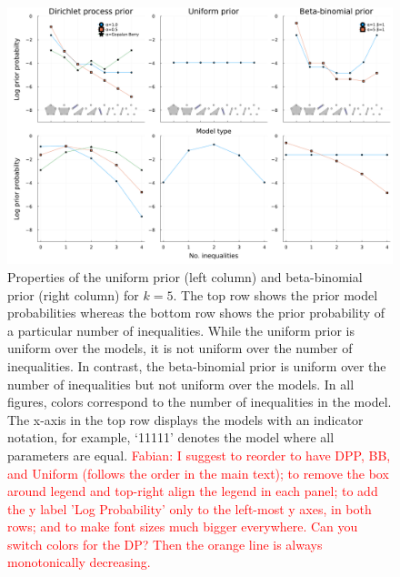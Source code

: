\documentclass[11pt,a4paper]{article}
\theoremstyle{definition} %
\theoremstyle{case}
\begin{document}
\begin{figure}
    \centering
    \includegraphics[width = \textwidth]{figures/visualizePriors_2x3.pdf}
    \caption{
    Properties of the uniform prior (left column) and beta-binomial prior (right column) for $k = 5$. The top row shows the prior model probabilities whereas the bottom row shows the prior probability of a particular number of inequalities. While the uniform prior is uniform over the models, it is not uniform over the number of inequalities. In contrast, the beta-binomial prior is uniform over the number of inequalities but not uniform over the models. In all figures, colors correspond to the number of inequalities in the model. The x-axis in the top row displays the models with an indicator notation, for example, `11111' denotes the model where all parameters are equal. \textcolor{red}{Fabian: I suggest to reorder to have DPP, BB, and Uniform (follows the order in the main text); to remove the box around legend and top-right align the legend in each panel; to add the y label 'Log Probability' only to the left-most y axes, in both rows; and to make font sizes much bigger everywhere. Can you switch colors for the DP? Then the orange line is always monotonically decreasing.}
    }
    \label{fig:prior-comparison}
\end{figure}
\end{document}
